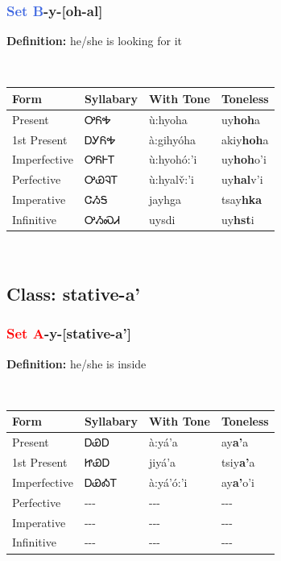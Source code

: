 \subsubsection*{\textcolor{RoyalBlue}{Set B}{-}\textbf{y}{-}[oh-al]}
\nopagebreak
\textbf{Definition: } he/she is looking for it
\\[0.5em]
\begin{tabularx}{\textwidth}{l X X X}%
\toprule%
\textbf{Form}&\textbf{Syllabary}&\textbf{With Tone}&\textbf{Toneless}\\%
\midrule%
Present&ᎤᏲᎭ&ù:hyoha&uy\textbf{hoh}a\\%
1st Present&ᎠᎩᏲᎭ&à:gihyóha&akiy\textbf{hoh}a\\%
Imperfective&ᎤᏲᎰᎢ&ù:hyohó:’i&uy\textbf{hoh}o'i\\%
Perfective&ᎤᏯᎸᎢ&ù:hyalv̌:’i&uy\textbf{hal}v'i\\%
Imperative&ᏣᏱᎦ&jayhga&tsay\textbf{hka}\\%
Infinitive&ᎤᏱᏍᏗ&uysdi&uy\textbf{hst}i\\%
\bottomrule%
\end{tabularx}
\\[1em]
\needspace{3in}
\subsection*{Class: stative-a'}
\nopagebreak
\needspace{2in}
\subsubsection*{\textcolor{Red}{Set A}{-}\textbf{y}{-}[stative-a']}
\nopagebreak
\textbf{Definition: } he/she is inside
\\[0.5em]
\begin{tabularx}{\textwidth}{l X X X}%
\toprule%
\textbf{Form}&\textbf{Syllabary}&\textbf{With Tone}&\textbf{Toneless}\\%
\midrule%
Present&ᎠᏯᎠ&à:yá’a&ay\textbf{a'}a\\%
1st Present&ᏥᏯᎠ&jiyá’a&tsiy\textbf{a'}a\\%
Imperfective&ᎠᏯᎣᎢ&à:yá’ó:’i&ay\textbf{a'}o'i\\%
Perfective&{-}{-}{-}&{-}{-}{-}&{-}{-}{-}\\%
Imperative&{-}{-}{-}&{-}{-}{-}&{-}{-}{-}\\%
Infinitive&{-}{-}{-}&{-}{-}{-}&{-}{-}{-}\\%
\bottomrule%
\end{tabularx}
\\[1em]